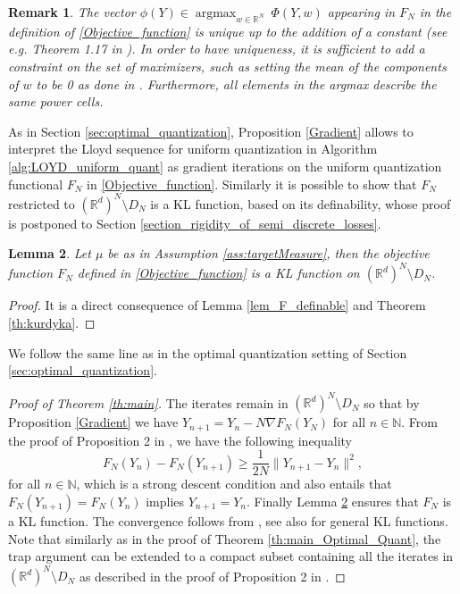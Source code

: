 \documentclass[11pt]{article}
\DeclareMathOperator{\argmax}{argmax}
\newcommand{\N}{\mathbb N}
\newcommand{\R}{\mathbb R}
\newcommand{\1}{\mathbbm{1}}
\newtheorem{lem}{Lemma}[section]
\newtheorem{rem}[lem]{Remark}
\numberwithin{equation}{section}
\begin{document}
\begin{rem}\label{rem_unicity}
The vector $\phi(Y)\in \argmax_{w\in \mathbb{R}^{N}} \ \Phi(Y,w)$ appearing in $F_N$ in the definition of \eqref{Objective_function} is unique up to the addition of a constant (see e.g. Theorem 1.17 in \cite{booksantambrogio}). In order to have uniqueness, it is sufficient to add a constraint on the set of maximizers, such as setting the mean of the components of $w$ to be 0 as done in \cite{refnewton}. Furthermore, all elements in the argmax describe the same power cells.
\end{rem}
As in Section \ref{sec:optimal_quantization}, Proposition \ref{Gradient} allows to interpret the Lloyd sequence for uniform quantization in Algorithm \ref{alg:LOYD_uniform_quant}
as gradient iterations on the uniform quantization functional $F_N$ in \eqref{Objective_function}.
Similarly it is possible to show that $F_N$ restricted to $(\R^d)^N\setminus D_N$ is a KL function, based on its definability, whose proof is postponed to Section \ref{section_rigidity_of_semi_discrete_losses}.
\begin{lem}\label{lem_mu_GSA_implies_F_KL}
	Let $\mu$ be as in Assumption \ref{ass:targetMeasure}, then the objective function $F_{N}$ defined in \eqref{Objective_function} is a KL function on $(\R^d)^N \setminus D_N$.
\end{lem}

\begin{proof}
	It is a direct consequence of Lemma \ref{lem_F_definable} and Theorem \ref{th:kurdyka}.
\end{proof}
We follow the same line as in the optimal quantization setting of Section \ref{sec:optimal_quantization}.

\begin{proof}[Proof of Theorem \ref{th:main}]
	The iterates remain in $(\R^d)^N \setminus D_N$ so that by Proposition \ref{Gradient} we have $Y_{n+1} = Y_n - N \nabla F_N(Y_N)$ for all $n \in \N$.
	From the proof of Proposition 2 in \cite{nonassymptotic}, we have the following inequality
	\begin{equation*}
	    F_{N}(Y_{n})-F_{N}(Y_{n+1})\geq \frac{1}{2N}\|Y_{n+1}-Y_{n}\|^{2},
	\end{equation*}
	for all $n \in \N$, which is a strong descent condition and also entails that $F_{N}(Y_{n+1}) = F_{N}(Y_{n})$ implies $Y_{n+1} = Y_n$.
	Finally Lemma \ref{lem_mu_GSA_implies_F_KL} ensures that $F_{N}$ is a KL function. The convergence follows from \cite[Theorem 3.4]{AbsMahAnd2005}, see also \cite{attouch2013convergence} for general KL functions. Note that similarly as in the proof of Theorem \ref{th:main_Optimal_Quant}, the trap argument can be extended to a compact subset containing all the iterates in $(\R^d)^N \setminus D_N$ as described in the proof of Proposition 2 in \cite{nonassymptotic}.
\end{proof}
\end{document}
